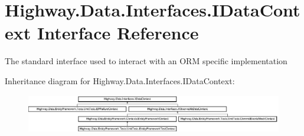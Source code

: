 \hypertarget{interface_highway_1_1_data_1_1_interfaces_1_1_i_data_context}{\section{Highway.\-Data.\-Interfaces.\-I\-Data\-Context Interface Reference}
\label{interface_highway_1_1_data_1_1_interfaces_1_1_i_data_context}
}


The standard interface used to interact with an O\-R\-M specific implementation  


Inheritance diagram for Highway.\-Data.\-Interfaces.\-I\-Data\-Context\-:\begin{figure}[H]
\begin{center}
\leavevmode
\includegraphics[height=1.670395cm]{interface_highway_1_1_data_1_1_interfaces_1_1_i_data_context}
\end{center}
\end{figure}
